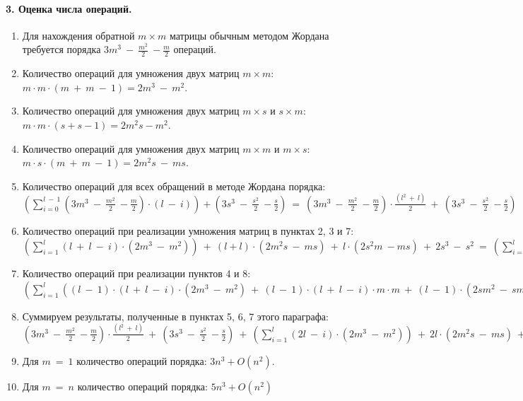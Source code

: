 \documentclass[14pt,a4paper, openany]{article}
\begin{document}
\paragraph{3. Оценка числа операций.}
\begin{enumerate}
\item Для нахождения обратной $m\times m$ матрицы обычным методом Жордана требуется порядка $ 3m^3\ -\ \frac{m^2}{2}\ -\frac{m}{2}$ операций.
\item Количество операций для умножения двух матриц $m\times m$:  $m\cdot m\cdot(m\ +\ m\ -\ 1) = 2m^3\ -\ m^2$.
\item Количество операций для умножения двух матриц $m\times s$ и $s\times m$:  $m\cdot m\cdot(s+s-1) = 2m^2s - m^2$.
\item Количество операций для умножения двух матриц $m\times m$ и $m\times s$: $m\cdot s\cdot(m\ +\ m\ -\ 1) = 2m^2s\ -\ ms$.
\item Количество операций для всех обращений в методе Жордана порядка: $(\sum\limits_{i=0}^{l\ -\ 1}(3m^3\ -\ \frac{m^2}{2}\ -\frac{m}{2})\cdot (l\ -\ i)) + (3s^3\ -\ \frac{s^2}{2}\ -\frac{s}{2})\ =\ (3m^3\ -\ \frac{m^2}{2}\ -\frac{m}{2})\cdot \frac {(l^2\ +\ l)}{2}\ +\ (3s^3\ -\ \frac{s^2}{2}\ -\frac{s}{2})$
\item Количество операций при реализации умножения матриц в пунктах 2, 3 и 7: $(\sum\limits_{i=1}^{l}(l\ +\ l\ -\ i)\cdot (2m^3\ -\ m^2))\ +\ (l + l)\cdot (2m^2s\ -\ ms)\ +\ l\cdot (2s^2m\ - ms)\ +\ 2s^3\ -\ s^2\ =\ (\sum\limits_{i=1}^{l}(2l\ -\ i)\cdot (2m^3\ -\ m^2))\ +\ 2l\cdot (2m^2s\ -\ ms)\ +\ l\cdot (2s^2m\ - ms)\ +\ 2s^3\ -\ s^2\ $
\item Количество операций при реализации пунктов 4 и 8: $(\sum\limits_{i=1}^l((l\ -\ 1)\cdot (l\ +\ l\ -\ i)\cdot (2m^3\ -\ m^2)\ +\ (l\ -\ 1)\cdot (l\ +\ l\ -\ i)\cdot m\cdot m\ +\ (l\ -\ 1)\cdot (2sm^2\ -\ sm)\cdot 2\ +\ (l\ -\ 1)\cdot 2sm)\ +\ (l\ +\ l\ -\ i)\cdot (2sm^2\ -\ ms)\ +\ (l\ +\ l\ -\ i)\cdot ms\ +\ 2\cdot (2ms^2\ -\ s^2)\ +\ 2\cdot s^2)\ +\ l^2\cdot (2m^2s\ -\ m^2)\ +\ l^2\cdot m^2\ =\ (\sum\limits_{i=1}^l(l\ -\ 1)\cdot ((2l\ -\ i)\cdot 2m^3\ +\ 4sm^2)\ +\ 2(2l\ -\ i)\cdot sm^2\ +\ 4ms^2)\ +\ 2sl^2m^2\ +\ 2lms^2 $ 
\item Суммируем результаты, полученные в пунктах 5, 6, 7 этого параграфа: $(3m^3\ -\ \frac{m^2}{2}\ -\frac{m}{2})\cdot \frac {(l^2\ +\ l)}{2}\ +\ (3s^3\ -\ \frac{s^2}{2}\ -\frac{s}{2})\ +\ (\sum\limits_{i=1}^{l}(2l\ -\ i)\cdot (2m^3\ -\ m^2))\ +\ 2l\cdot (2m^2s\ -\ ms)\ +\ l\cdot (2s^2m\ - ms)\ +\ 2s^3\ -\ s^2\ +\ (\sum\limits_{i=1}^l(l\ -\ 1)\cdot ((2l\ -\ i)\cdot 2m^3\ +\ 4sm^2)\ +\ 2(2l\ -\ i)\cdot sm^2\ +\ 4ms^2)\ +\ 2sl^2m^2\ +\ 2lms^2\ =\ m^3\cdot (0.5l^2 +1.5l+3l^3)\ +\ m^2\cdot (\frac{l-7l^2}{4}\ +\ 5ls\ +\ 6sl^3\ -\ 3sl^2)\ +\ m\cdot (-0.25l^2\ -\ 0.25l\ -\ 3ls\ +\ 8ls^2)\ +\ 5s^3\ -\ 1.5s^2\ -\ 0.5s $ 
\item Для $m\ =\ 1$ количество операций порядка: $3n^3 + O(n^2)$.
\item Для $m\ =\ n$ количество операций порядка: $5n^3 + O(n^2)$

\end{enumerate}
\end{document}
